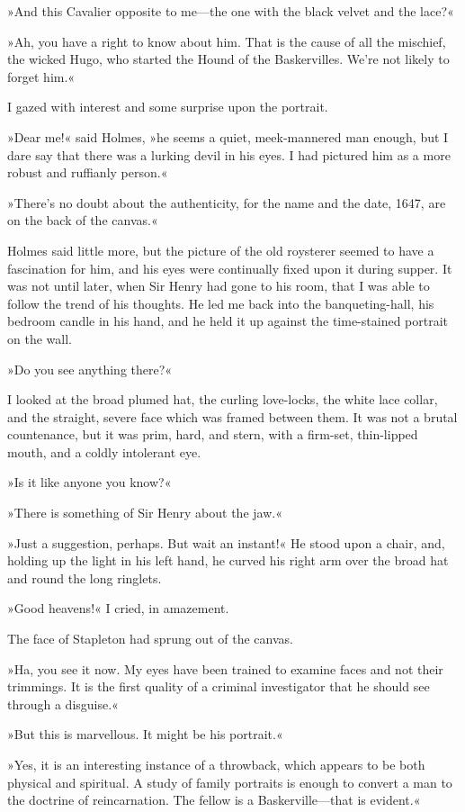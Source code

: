 »And this Cavalier opposite to me\allowbreak---\allowbreak the one with the black velvet and the lace?«

»Ah, you have a right to know about him. That is the cause of all the mischief, the wicked Hugo, who started the Hound of the Baskervilles. We're not likely to forget him.«

I gazed with interest and some surprise upon the portrait.

»Dear me!« said Holmes, »he seems a quiet, meek-mannered man enough, but I dare say that there was a lurking devil in his eyes. I had pictured him as a more robust and ruffianly person.«

»There's no doubt about the authenticity, for the name and the date, 1647, are on the back of the canvas.«

Holmes said little more, but the picture of the old roysterer seemed to have a fascination for him, and his eyes were continually fixed upon it during supper. It was not until later, when Sir Henry had gone to his room, that I was able to follow the trend of his thoughts. He led me back into the banqueting-hall, his bedroom candle in his hand, and he held it up against the time-stained portrait on the wall.

»Do you see anything there?«

I looked at the broad plumed hat, the curling love-locks, the white lace collar, and the straight, severe face which was framed between them. It was not a brutal countenance, but it was prim, hard, and stern, with a firm-set, thin-lipped mouth, and a coldly intolerant eye.

»Is it like anyone you know?«

»There is something of Sir Henry about the jaw.«

»Just a suggestion, perhaps. But wait an instant!« He stood upon a chair, and, holding up the light in his left hand, he curved his right arm over the broad hat and round the long ringlets.

»Good heavens!« I cried, in amazement.

The face of Stapleton had sprung out of the canvas.

»Ha, you see it now. My eyes have been trained to examine faces and not their trimmings. It is the first quality of a criminal investigator that he should see through a disguise.«

»But this is marvellous. It might be his portrait.«

»Yes, it is an interesting instance of a throwback, which appears to be both physical and spiritual. A study of family portraits is enough to convert a man to the doctrine of reincarnation. The fellow is a Baskerville\allowbreak---\allowbreak that is evident.«

